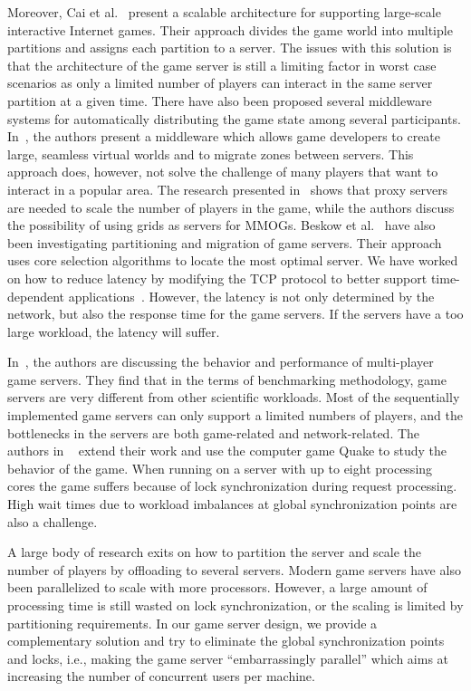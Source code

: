 %
Moreover, Cai et al.~\cite{Cai2002++} present a scalable architecture
for supporting large-scale interactive Internet games. Their approach
divides the game world into multiple partitions and assigns each
partition to a server. The issues with this solution is that the
architecture of the game server is still a limiting factor in worst
case scenarios as only a limited number of players can interact in the
same server partition at a given time. 
%
There have also been proposed
several middleware systems for automatically distributing the game
state among several participants. In~\cite{Glinka2007++}, the authors
present a middleware which allows game developers to create
large, seamless virtual worlds and to migrate zones between
servers. This approach does, however, not solve the challenge of many
players that want to interact in a popular
area. 
The research presented in~\cite{Muller2007++} shows that proxy
servers are needed to scale the number of players in the game, while the authors discuss the possibility of
using grids as servers for MMOGs. Beskow et al.~\cite{Beskow2009++} have also been
investigating partitioning and migration of game servers. Their
approach uses core selection algorithms to locate the most optimal
server.
We have worked on how to reduce latency by
modifying the TCP protocol to better support time-dependent
applications~\cite{Petlund2009}.  However, the latency is not only
determined by the network, but also the response time for the game
servers. If the servers have a too large workload, the latency will
suffer.

In~\cite{Abdelkhalek2003++}, the authors are discussing the behavior
and performance of multi-player game servers. They find that in the
terms of benchmarking methodology, game servers are very different
from other scientific workloads. Most of the sequentially implemented
game servers can only support a limited numbers of players, and the
bottlenecks in the servers are both game-related and
network-related. The authors in ~\cite{Abdelkhalek2004++} extend their
work and use the computer game Quake to study the behavior of the game. When
running on a server with up to eight processing cores the game suffers
because of lock synchronization during request processing. High wait
times due to workload imbalances at global synchronization points are
also a challenge.

A large body of research exits on
how to partition the server and scale the number of players by
offloading to several servers.  Modern game servers have also been
parallelized to scale with more processors. However, a large amount of
processing time is still wasted on lock synchronization, or the scaling is limited by partitioning requirements. In our game
server design, we provide a complementary solution and try to
eliminate the global synchronization points and locks, i.e., making the
game server ``embarrassingly parallel'' which aims at
increasing the number of concurrent users per machine.

